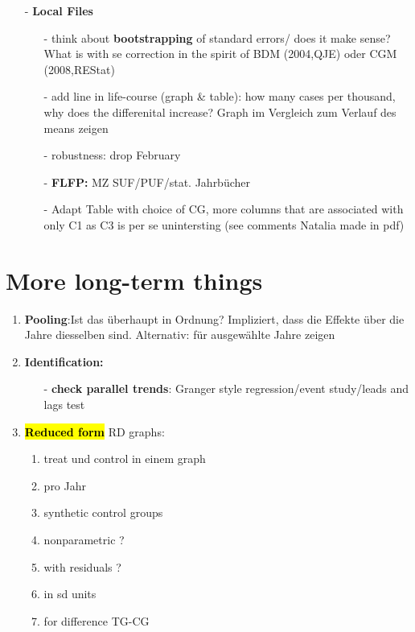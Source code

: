 \documentclass[11pt,a4paper]{article}
\begin{document}
{\begin{itemize}
\item[-] \textbf{Local Files}
\begin{itemize}
	\item[-] think about \textbf{bootstrapping} of standard errors/ does it make sense? What is with se correction in the spirit of BDM (2004,QJE) oder CGM (2008,REStat)
	\item[-] add line in life-course (graph \& table): how many cases per thousand, why does the differenital increase? Graph im Vergleich zum Verlauf des means zeigen
	
	\item[-] robustness: drop February
	
	\item[-] \textbf{FLFP:} MZ SUF/PUF/stat. Jahrbücher
	
	\item[-] Adapt Table with choice of CG, more columns that are associated with only C1 as C3 is per se unintersting (see comments Natalia made in pdf)
\end{itemize}	
\end{itemize}
\newpage
\section{More long-term things}
\begin{enumerate}
\item \textbf{Pooling}:\newline Ist das  überhaupt in Ordnung? Impliziert, dass die Effekte über die Jahre diesselben sind. Alternativ: für ausgewählte	Jahre zeigen


\item \textbf{Identification:}\vspace{-1em}
\begin{itemize}
	\item[-]\textbf{check parallel trends}: Granger style regression/event study/leads and lags test
\end{itemize}


\item \textbf{\hl{Reduced form}}\newline 
RD graphs:\vspace{-1em}
\begin{enumerate}
	\item treat und control in einem graph
	\item pro Jahr
	\item synthetic control groups
	\item nonparametric ? 
	\item with residuals ? 
	\item in sd units 
	\item for difference TG-CG
\end{enumerate}



\end{enumerate}}
\end{document}
